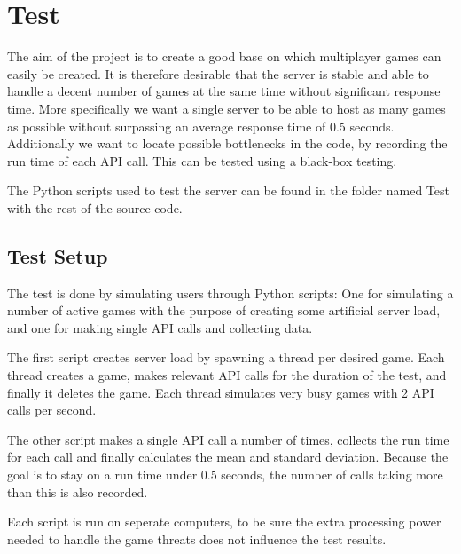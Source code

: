 \section{Test}
The aim of the project is to create a good base on which multiplayer games can easily be created. It is therefore desirable that the server is stable and able to handle a decent number of games at the same time without significant response time. More specifically we want a single server to be able to host as many games as possible without surpassing an average response time of 0.5 seconds. Additionally we want to locate possible bottlenecks in the code, by recording the run time of each API call. This can be tested using a black-box testing.

The Python scripts used to test the server can be found in the folder named Test with the rest of the source code.

\subsection{Test Setup}
\label{sec:testSetup}
The test is done by simulating users through Python scripts: One for simulating a number of active games with the purpose of creating some artificial server load, and one for making single API calls and collecting data.

The first script creates server load by spawning a thread per desired game. Each thread creates a game, makes relevant API calls for the duration of the test, and finally it deletes the game. Each thread simulates very busy games with 2 API calls per second. 

The other script makes a single API call a number of times, collects the run time for each call and finally calculates the mean and standard deviation. Because the goal is to stay on a run time under 0.5 seconds, the number of calls taking more than this is also recorded.

Each script is run on seperate computers, to be sure the extra processing power needed to handle the game threats does not influence the test results. 


